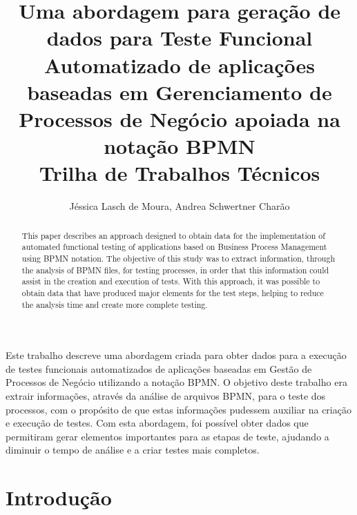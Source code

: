 \documentclass[12pt]{article}
\title{Uma abordagem para geração de dados para Teste Funcional Automatizado de aplicações baseadas em Gerenciamento de Processos de Negócio apoiada na notação BPMN\\\vspace{0.5cm} \small{Trilha de Trabalhos Técnicos}}
\author{Jéssica Lasch de Moura\inst{1}, Andrea Schwertner Charão\inst{1}}
\begin{document}
 

\maketitle

\begin{abstract}

This paper describes an approach designed to obtain data for the implementation of automated functional testing of applications based on Business Process Management using BPMN notation. The objective of this study was to extract information, through the analysis of BPMN files, for testing processes, in order that this information could assist in the creation and execution of tests. With this approach, it was possible to obtain data that have produced major elements for the test steps, helping to reduce the analysis time and create more complete testing.
\end{abstract}
     
\begin{resumo} 

Este trabalho descreve uma abordagem criada para obter dados para a execução de testes funcionais automatizados de aplicações baseadas em Gestão de Processos de Negócio utilizando a notação BPMN. O objetivo deste trabalho era extrair informações, através da análise de arquivos BPMN, para o teste dos processos, com o propósito de que estas informações pudessem auxiliar na criação e execução de testes. Com esta abordagem, foi possível obter dados que permitiram gerar elementos importantes para as etapas de teste, ajudando a diminuir o tempo de análise e a criar testes mais completos.

\end{resumo}

\section{Introdução}
\end{document}
